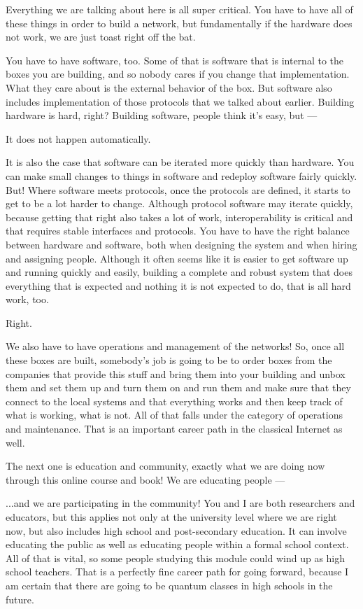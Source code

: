 \rrr Everything we are talking about here is all super critical. You have to have all of these things in order to build a network, but fundamentally if the hardware does not work, we are just toast right off the bat.

You have to have software, too. Some of that is software that is internal to the boxes you are building, and so nobody cares if you change that implementation. What they care about is the external behavior of the box. But software also includes implementation of those protocols that we talked about earlier. Building hardware is hard, right? Building software, people think it's easy, but ---

\mmm It does not happen automatically.

\rrr It is also the case that software can be iterated more quickly than hardware. You can make small changes to things in software and redeploy software fairly quickly. But! Where software meets protocols, once the protocols are defined, it starts to get to be a lot harder to change. Although protocol software may iterate quickly, because getting that right also takes a lot of work, interoperability is critical and that requires stable interfaces and protocols. You have to have the right balance between hardware and software, both when designing the system and when hiring and assigning people. Although it often seems like it is easier to get software up and running quickly and easily, building a complete and robust system that does everything that is expected and nothing it is not expected to do, that is all hard work, too.

\mmm Right.

\rrr We also have to have operations and management of the networks! So, once all these boxes are built, somebody's job is going to be to order boxes from the companies that provide this stuff and bring them into your building and unbox them and set them up and turn them on and run them and make sure that they connect to the local systems and that everything works and then keep track of what is working, what is not. All of that falls under the category of operations and maintenance. That is an important career path in the classical Internet as well.

\mmm The next one is education and community, exactly what we are doing now through this online course and book! We are educating people ---

\rrr ...and we are participating in the community! You and I are both researchers and educators, but this applies not only at the university level where we are right now, but also includes high school and post-secondary education. It can involve educating the public as well as educating people within a formal school context. All of that is vital, so some people studying this module could wind up as high school teachers. That is a perfectly fine career path for going forward, because I am certain that there are going to be quantum classes in high schools in the future.

